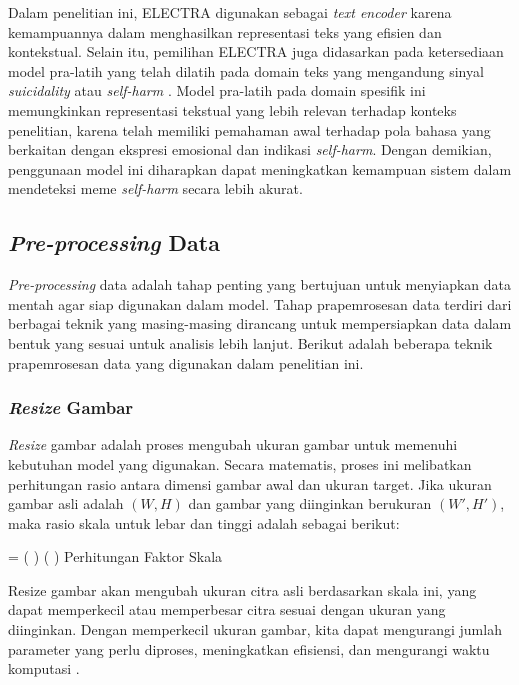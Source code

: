 Dalam penelitian ini, ELECTRA digunakan sebagai \textit{text encoder} karena kemampuannya dalam menghasilkan representasi teks yang efisien dan kontekstual. 
Selain itu, pemilihan ELECTRA juga didasarkan pada ketersediaan model pra-latih yang telah dilatih pada domain teks yang mengandung sinyal \textit{suicidality} atau \textit{self-harm} \cite{sentinet_suicidality}. Model pra-latih pada domain spesifik ini memungkinkan representasi tekstual yang lebih relevan terhadap konteks penelitian, karena telah memiliki pemahaman awal terhadap pola bahasa yang berkaitan dengan ekspresi emosional dan indikasi \textit{self-harm}. Dengan demikian, penggunaan model ini diharapkan dapat meningkatkan kemampuan sistem dalam mendeteksi meme \textit{self-harm} secara lebih akurat.


\subsection{\textit{Pre-processing} Data} \label{II.teori11}
\textit{Pre-processing} data adalah tahap penting  yang bertujuan untuk menyiapkan data mentah agar siap digunakan dalam model. Tahap prapemrosesan data terdiri dari berbagai teknik yang masing-masing dirancang untuk mempersiapkan data dalam bentuk yang sesuai untuk analisis lebih lanjut. Berikut adalah beberapa teknik prapemrosesan data yang digunakan dalam penelitian ini.


\subsubsection{\textit{Resize} Gambar} \label{II.teori11.1}
\textit{Resize} gambar adalah proses mengubah ukuran gambar untuk memenuhi kebutuhan model yang digunakan. Secara matematis, proses ini melibatkan perhitungan rasio antara dimensi gambar awal dan ukuran target. Jika ukuran gambar asli adalah $(W, H)$ dan gambar yang diinginkan berukuran $(W', H')$, maka rasio skala untuk lebar dan tinggi adalah sebagai berikut: 
\\

\begin{equationcaptioned}{
	 = \left(  \right) \left(  \right)
}{
Perhitungan Faktor Skala
}
\end{equationcaptioned}

Resize gambar akan mengubah ukuran citra asli berdasarkan skala ini, yang dapat memperkecil atau memperbesar citra sesuai dengan ukuran yang diinginkan. Dengan memperkecil ukuran gambar, kita dapat mengurangi jumlah parameter yang perlu diproses, meningkatkan efisiensi, dan mengurangi waktu komputasi \cite{Xu2023ImageAugmentationSurvey}.

